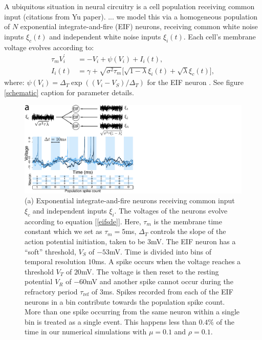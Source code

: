 \documentclass[%
 reprint,
 twocolumn,
 amsmath,amssymb,
 aps,
floatfix,
]{revtex4}
\begin{document}
A ubiquitous situation in neural circuitry is a cell population receiving common input (citations from Yu paper). ... we model this via a homogeneous population of $N$ exponential integrate-and-fire (EIF) neurons, receiving common white noise inputs $\xi_c(t)$ and independent white noise inputs $\xi_i(t)$.  Each cell's membrane voltage evolves according to: 
\begin{align}
\label{eifsde}
\tau_m V_i^\prime &= -V_i +\psi(V_i)+I_i(t),\\
I_i(t) &= \gamma+\sqrt{\sigma^2\tau_m}\big[\sqrt{1-\lambda}\xi_i(t)+\sqrt{\lambda}\xi_c(t)\big] \nonumber,
\end{align}
where: $\psi(V_i) =\Delta_T \exp{\left((V_i - V_S)/\Delta_T\right)}$ for the EIF neuron \cite{Fourcard-Troume, Abbott-Dayan}. See figure \ref{schematic} caption for parameter details.

\begin{figure}[t!]
\includegraphics{figures/EIF_schematic}
\caption{\label{fig:schematic} (a) Exponential integrate-and-fire neurons receiving common input $\xi_c$ and independent inputs $\xi_i$. The voltages of the neurons evolve according to equation [\ref{eifsde}]. Here, $\tau_m$ is the membrane time constant which we set as $\tau_m = 5$ms, $\Delta_T$ controls the slope of the action potential initiation, taken to be $3$mV. The EIF neuron has a ``soft'' threshold, $V_S$ of $-53$mV. Time is divided into bins of temporal resolution $10$ms. A spike occurs when the voltage reaches a threshold $V_T$ of $20$mV. The voltage is then reset to the resting potential $V_R$ of $-60$mV and another spike cannot occur during the refractory period $\tau_{\text{ref}}$ of $3$ms. Spikes recorded from each of the EIF neurons in a bin contribute towards the population spike count.  More than one spike occurring from the same neuron within a single bin is treated as a single event. This happens less than $0.4\%$ of the time in our numerical simulations with $\mu=0.1$ and $\rho=0.1$.
}
\end{figure}
\end{document}
